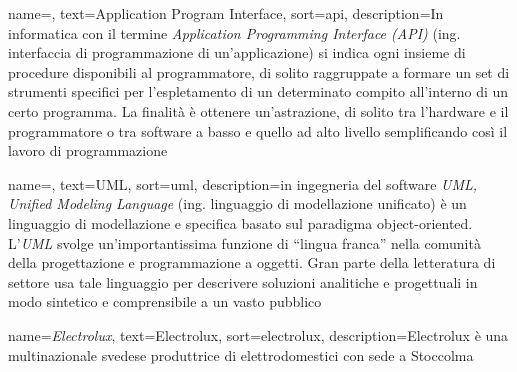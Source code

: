 




	
\renewcommand{\glossaryname}{Glossario}

{
	name=,
	text=Application Program Interface,
	sort=api,
	description={In informatica con il termine \emph{Application Programming Interface (API)} (ing. interfaccia di programmazione di un'applicazione) si indica ogni insieme di procedure disponibili al programmatore, di solito raggruppate a formare un set di strumenti specifici per l'espletamento di un determinato compito all'interno di un certo programma. La finalità è ottenere un'astrazione, di solito tra l'hardware e il programmatore o tra software a basso e quello ad alto livello semplificando così il lavoro di programmazione}
}

{
	name=,
	text=UML,
	sort=uml,
	description={in ingegneria del software \emph{UML, Unified Modeling Language} (ing. linguaggio di modellazione unificato) è un linguaggio di modellazione e specifica basato sul paradigma object-oriented. L'\emph{UML} svolge un'importantissima funzione di ``lingua franca'' nella comunità della progettazione e programmazione a oggetti. Gran parte della letteratura di settore usa tale linguaggio per descrivere soluzioni analitiche e progettuali in modo sintetico e comprensibile a un vasto pubblico}
}

{
	name={\textit{Electrolux}},
	text=Electrolux,
	sort=electrolux,
	description={Electrolux è una multinazionale svedese produttrice di elettrodomestici con sede a Stoccolma}
}

